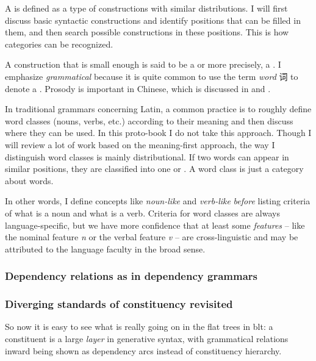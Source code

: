 \documentclass[../main.tex]{subfiles}
\begin{document}
A  is defined as a type of constructions with similar distributions.
I will first discuss basic syntactic constructions and identify positions that can be filled in them, 
and then search possible constructions in these positions. This is how categories can be recognized.

A construction that is small enough is said to be a  or more precisely, 
a .
I emphasize \emph{grammatical} because it is quite common to use the term \emph{word} 词 to denote 
a . Prosody is important in Chinese, which is discussed in 
 and . 

In traditional grammars concerning Latin, 
a common practice is to roughly define word classes (nouns, verbs, etc.) 
according to their meaning and then discuss where they can be used. 
In this proto-book I do not take this approach. 
Though I will review a lot of work based on the meaning-first approach, 
the way I distinguish word classes is mainly distributional. 
If two words can appear in similar positions, 
they are classified into one  or .
A word class is just a category about words.  

In other words, I define concepts like \emph{noun-like} and \emph{verb-like} \emph{before} listing criteria of 
what is a noun and what is a verb. Criteria for word classes are always language-specific, but we have more 
confidence that at least some \emph{features} -- like the nominal feature \textit{n} or the verbal feature 
\textit{v} -- are cross-linguistic and may be attributed to the language faculty in the broad sense. 

\subsubsection{Dependency relations as in dependency grammars}\label{sec:dependency}



\subsubsection{Diverging standards of constituency revisited}

So now it is easy to see what is really going on in the flat trees in \ac{blt}: a constituent
is a large \emph{layer} in generative syntax, with grammatical relations inward being shown as 
dependency arcs instead of constituency hierarchy. 
\end{document}
